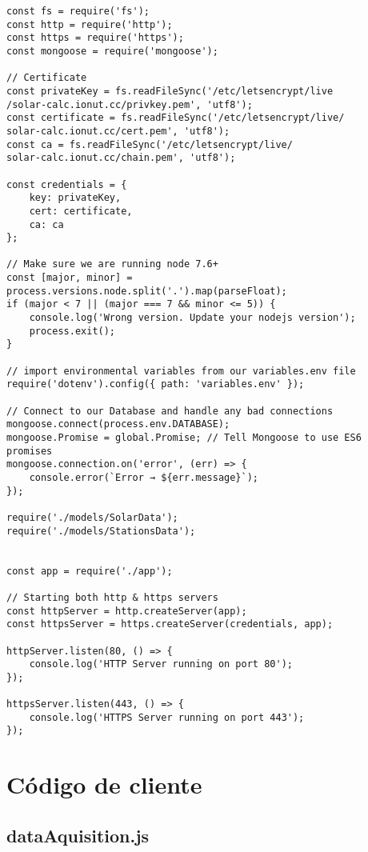 \begin{lstlisting}[style=ES6, caption={Server/start.js}]
const fs = require('fs');
const http = require('http');
const https = require('https');
const mongoose = require('mongoose');

// Certificate
const privateKey = fs.readFileSync('/etc/letsencrypt/live
/solar-calc.ionut.cc/privkey.pem', 'utf8');
const certificate = fs.readFileSync('/etc/letsencrypt/live/
solar-calc.ionut.cc/cert.pem', 'utf8');
const ca = fs.readFileSync('/etc/letsencrypt/live/
solar-calc.ionut.cc/chain.pem', 'utf8');

const credentials = {
	key: privateKey,
	cert: certificate,
	ca: ca
};

// Make sure we are running node 7.6+
const [major, minor] = process.versions.node.split('.').map(parseFloat);
if (major < 7 || (major === 7 && minor <= 5)) {
	console.log('Wrong version. Update your nodejs version');
	process.exit();
}

// import environmental variables from our variables.env file
require('dotenv').config({ path: 'variables.env' });

// Connect to our Database and handle any bad connections
mongoose.connect(process.env.DATABASE);
mongoose.Promise = global.Promise; // Tell Mongoose to use ES6 promises
mongoose.connection.on('error', (err) => {
	console.error(`Error → ${err.message}`);
});

require('./models/SolarData');
require('./models/StationsData');


const app = require('./app');

// Starting both http & https servers
const httpServer = http.createServer(app);
const httpsServer = https.createServer(credentials, app);

httpServer.listen(80, () => {
	console.log('HTTP Server running on port 80');
});

httpsServer.listen(443, () => {
	console.log('HTTPS Server running on port 443');
});
\end{lstlisting}

\section{Código de cliente}


\subsection{dataAquisition.js}

